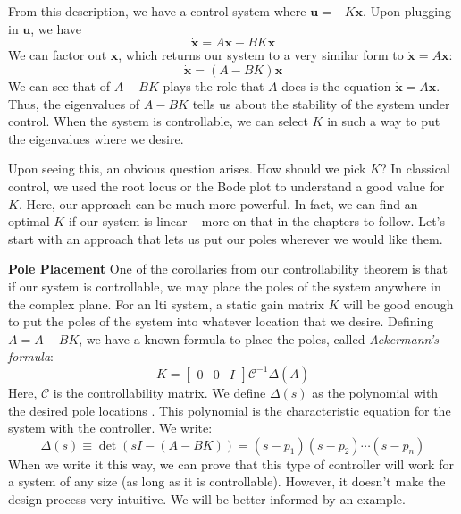 From this description, we have a control system where $\bm{u}=-K\bm{x}$. Upon plugging in $\bm{u}$, we have
$$\bm{\dot{x}}=A\bm{x}-BK\bm{x}$$
We can factor out $\bm{x}$, which returns our system to a very similar form to $\bm{\dot{x}}=A\bm{x}$:
$$\bm{\dot{x}}=(A-BK)\bm{x}$$
We can see that of $A-BK$ plays the role that $A$ does is the equation $\bm{\dot{x}}=A\bm{x}$. Thus, the eigenvalues of $A-BK$ tells us about the stability of the system under control. When the system is controllable, we can select $K$ in such a way to put the eigenvalues where we desire.

Upon seeing this, an obvious question arises. How should we pick $K$? In classical control, we used the root locus or the Bode plot to understand a good value for $K$. Here, our approach can be much more powerful. In fact, we can find an optimal $K$ if our system is linear -- more on that in the chapters to follow. Let's start with an approach that lets us put our poles wherever we would like them.

\textbf{Pole Placement}
One of the corollaries from our controllability theorem is that if our system is controllable, we may place the poles of the system anywhere in the complex plane. For an \gls{lti} system, a static gain matrix $K$ will be good enough to put the poles of the system into whatever location that we desire. Defining $\bar{A}=A-BK$, we have a known formula to place the poles, called \textit{Ackermann's formula}:
$$K=\begin{bmatrix}
    0&0&I
\end{bmatrix}{\mathcal{C}}^{-1}\Delta(\bar{A})$$
Here, $\mathcal{C}$ is the controllability matrix. We define $\Delta(s)$ as the polynomial with the desired pole locations . This polynomial is the characteristic equation for the system with the controller. We write:
$$\Delta(s)\equiv\det(sI-(A-BK))=(s-p_1)(s-p_2)\cdots (s-p_n)$$
When we write it this way, we can prove that this type of controller will work for a system of any size (as long as it is controllable). However, it doesn't make the design process very intuitive. We will be better informed by an example.

